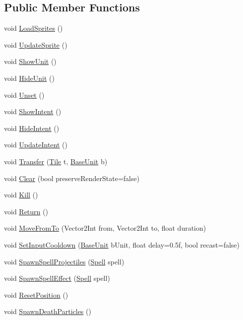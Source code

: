 \subsection*{Public Member Functions}
\begin{DoxyCompactItemize}
\item 
void \mbox{\hyperlink{class_unit_behaviour_a544570d55168594c1e4502dbe5c9d6a8}{Load\+Sprites}} ()
\item 
void \mbox{\hyperlink{class_unit_behaviour_a559fdec9ef2c1c1a6c1a863cb868bce5}{Update\+Sprite}} ()
\item 
void \mbox{\hyperlink{class_unit_behaviour_a41b8d7f5a98e21449eafe21a31707b1d}{Show\+Unit}} ()
\item 
void \mbox{\hyperlink{class_unit_behaviour_aaf48af005978a326a61c98905630e469}{Hide\+Unit}} ()
\item 
void \mbox{\hyperlink{class_unit_behaviour_adf2d07785a2cc3076363ad5dd0962b9c}{Unset}} ()
\item 
void \mbox{\hyperlink{class_unit_behaviour_a0cf70610b8aef46ef592819496ac7950}{Show\+Intent}} ()
\item 
void \mbox{\hyperlink{class_unit_behaviour_a9ba9de594c111333c048b477dd295025}{Hide\+Intent}} ()
\item 
void \mbox{\hyperlink{class_unit_behaviour_a38efbe995d8d2f3c522cb2fa076e79cc}{Update\+Intent}} ()
\item 
void \mbox{\hyperlink{class_unit_behaviour_a7e978454f207985987f6088c037b9c5f}{Transfer}} (\mbox{\hyperlink{class_tile}{Tile}} t, \mbox{\hyperlink{class_base_unit}{Base\+Unit}} b)
\item 
void \mbox{\hyperlink{class_unit_behaviour_a89fa86241b11f695b89b7143fa4f88ec}{Clear}} (bool preserve\+Render\+State=false)
\item 
void \mbox{\hyperlink{class_unit_behaviour_a9a32f3234ea6b89f686c6cd55d924348}{Kill}} ()
\item 
void \mbox{\hyperlink{class_unit_behaviour_a4b2664ef7a33e795220d587cb789d169}{Return}} ()
\item 
void \mbox{\hyperlink{class_unit_behaviour_a46ff5685dd97f930e6e2a835e01efb4d}{Move\+From\+To}} (Vector2\+Int from, Vector2\+Int to, float duration)
\item 
void \mbox{\hyperlink{class_unit_behaviour_aa4e86ce34131fe81ecef7a56855f8d94}{Set\+Input\+Cooldown}} (\mbox{\hyperlink{class_base_unit}{Base\+Unit}} b\+Unit, float delay=0.\+5f, bool recast=false)
\item 
void \mbox{\hyperlink{class_unit_behaviour_a2eee29cede96c8d2aa45e89eda7c0c3c}{Spawn\+Spell\+Projectiles}} (\mbox{\hyperlink{class_spell}{Spell}} spell)
\item 
void \mbox{\hyperlink{class_unit_behaviour_a558929aaa9173e1a3b9dfecd8674660f}{Spawn\+Spell\+Effect}} (\mbox{\hyperlink{class_spell}{Spell}} spell)
\item 
void \mbox{\hyperlink{class_unit_behaviour_a19e4ade6b8de90c269e3ed840d0c9f84}{Reset\+Position}} ()
\item 
void \mbox{\hyperlink{class_unit_behaviour_a17b46e508ee650f487d4bf79608da4eb}{Spawn\+Death\+Particles}} ()
\end{DoxyCompactItemize}
